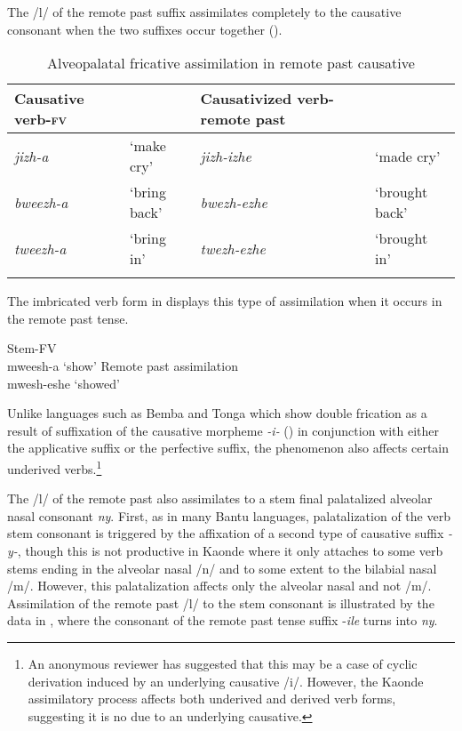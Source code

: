 \documentclass[output=paper]{langsci/langscibook}
\begin{document}
The /l/ of the remote past suffix assimilates completely to the causative consonant when the two suffixes occur together ().


\begin{table}
\begin{tabularx}{\textwidth}{p{2cm}Xp{3cm}X}
\lsptoprule
Causative verb-\textsc{fv} &  & Causativized \newline verb-remote past & \\
\midrule
\textit{jizh-a} & `make cry' & \textit{jizh-izhe} & `made cry' \\
\textit{bweezh-a} & `bring back' & \textit{bwezh-ezhe} & `brought back' \\
\textit{tweezh-a} & `bring in' & \textit{twezh-ezhe} & `brought in' \\

\lspbottomrule
\end{tabularx}

\caption{Alveopalatal fricative assimilation in remote past causative}
\label{tab:7.kawasha}

 \end{table}


The imbricated verb form in  displays this type of assimilation when it occurs in the remote past tense. 


\ea\label{ex:4.kawasha}
   \ea\label{ex:4a.kawasha} {Stem-FV}\\
mweesh-a ‘show’
    \ex\label{ex:4b.kawasha} {Remote past assimilation}\\
mwesh-eshe ‘showed'
\z
\z 


Unlike languages such as Bemba and Tonga which show double frication as a result of suffixation of the causative morpheme \textit{-i-} (\citealt{hyman1995,hyman2003}) in conjunction with either the applicative suffix or the perfective suffix, the phenomenon also affects certain underived verbs.\footnote{An anonymous reviewer has suggested that this may be a case of cyclic derivation induced by an underlying causative /i/. However, the Kaonde assimilatory process affects both underived and derived verb forms, suggesting it is no due to an underlying causative.}

 
The /l/ of the remote past also assimilates to a stem final palatalized alveolar nasal consonant \textit{ny}. First, as in many Bantu languages, palatalization of the verb stem consonant is triggered by the affixation of a second type of causative suffix \textit{-y-}, though this is not productive in Kaonde where it only attaches to some verb stems ending in the alveolar nasal /n/ and to some extent to the bilabial nasal /m/. However, this palatalization affects only the alveolar nasal and not /m/. Assimilation of the remote past /l/ to the stem consonant is illustrated by the data in , where the consonant of the remote past tense suffix -\textit{ile} turns into \textit{ny}.  
 
\end{document}
